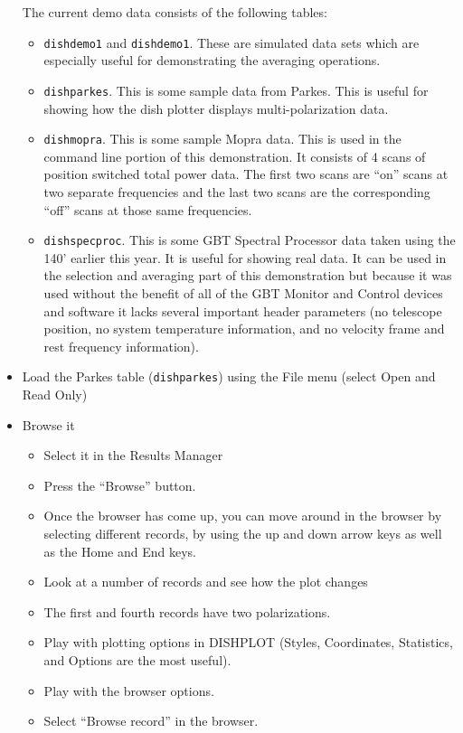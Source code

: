 \begin{itemize}
The current demo data consists of the following tables:
\begin{itemize}
\item {\tt dishdemo1} and {\tt dishdemo1}.  These are simulated data sets which are
especially useful for demonstrating the averaging operations.
\item {\tt dishparkes}.  This is some sample data from Parkes.  This is useful
for showing how the dish plotter displays multi-polarization data.
\item {\tt dishmopra}.  This is some sample Mopra data.  This is used in
the command line portion of this demonstration.  It consists of 4 scans
of position switched total power data.  The first two scans are ``on''
scans at two separate frequencies and the last two scans are the
corresponding ``off'' scans at those same frequencies.
\item {\tt dishspecproc}.  This is some GBT Spectral Processor data taken using
the 140' earlier this year.  It is useful for showing real data.  It can
be used in the selection and averaging part of this demonstration but
because it was used without the benefit of all of the GBT Monitor and
Control devices and software it lacks several important header parameters
(no telescope position, no system temperature information, and no
velocity frame and rest frequency information).
\end{itemize}
\item Load the Parkes table ({\tt dishparkes}) using the File menu (select Open
and Read Only)
\item Browse it
\begin{itemize}
\item Select it in the Results Manager
\item Press the ``Browse'' button.
\item Once the browser has come up, you can move around in the browser
by selecting different records, by using the up and down arrow keys as well
as the Home and End keys.
\item Look at a number of records and see how the plot changes
\item The first and fourth records have two polarizations.
\item Play with plotting options in DISHPLOT (Styles, Coordinates,
Statistics, and Options are the most useful).
\item Play with the browser options.
\item Select ``Browse record'' in the browser.
\begin{itemize}

\end{itemize}
\end{itemize}
\end{itemize}
